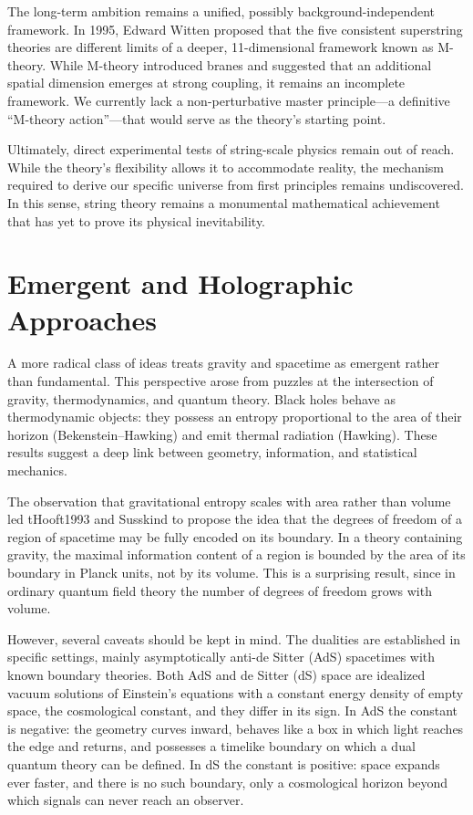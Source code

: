 The long-term ambition remains a unified, possibly background-independent framework.
In 1995, Edward Witten proposed that the five consistent superstring theories are different limits of a deeper, 11-dimensional framework known as M-theory.
While M-theory introduced branes and suggested that an additional spatial dimension emerges at strong coupling, it remains an incomplete framework.
We currently lack a non-perturbative master principle—a definitive ``M-theory action''—that would serve as the theory's starting point.

Ultimately, direct experimental tests of string-scale physics remain out of reach.
While the theory's flexibility allows it to accommodate reality, the mechanism required to derive our specific universe from first principles remains undiscovered.
In this sense, string theory remains a monumental mathematical achievement that has yet to prove its physical inevitability.


\section{Emergent and Holographic Approaches}

A more radical class of ideas treats gravity and spacetime as emergent rather
than fundamental. This perspective arose from puzzles at the intersection of
gravity, thermodynamics, and quantum theory. Black holes behave as
thermodynamic objects: they possess an entropy proportional to the area of
their horizon (Bekenstein--Hawking) and emit thermal radiation (Hawking).
These results suggest a deep link between geometry, information, and
statistical mechanics.

The observation that gravitational entropy scales with area rather than
volume led tHooft1993 and Susskind to propose the
idea that the degrees of freedom of a region of spacetime may be fully encoded
on its boundary. In a theory containing gravity, the maximal information
content of a region is bounded by the area of its boundary in Planck units,
not by its volume. This is a surprising result, since in ordinary quantum
field theory the number of degrees of freedom grows with volume.

However, several caveats should be kept in mind. The dualities are established in
specific settings, mainly asymptotically anti-de Sitter (AdS) spacetimes with
known boundary theories. Both AdS and de Sitter (dS) space are idealized
vacuum solutions of Einstein's equations with a constant energy density of
empty space, the cosmological constant, and they differ in its sign. In AdS
the constant is negative: the geometry curves inward, behaves like a box in
which light reaches the edge and returns, and possesses a timelike boundary on
which a dual quantum theory can be defined. In dS the constant is positive:
space expands ever faster, and there is no such boundary, only a cosmological
horizon beyond which signals can never reach an observer.

